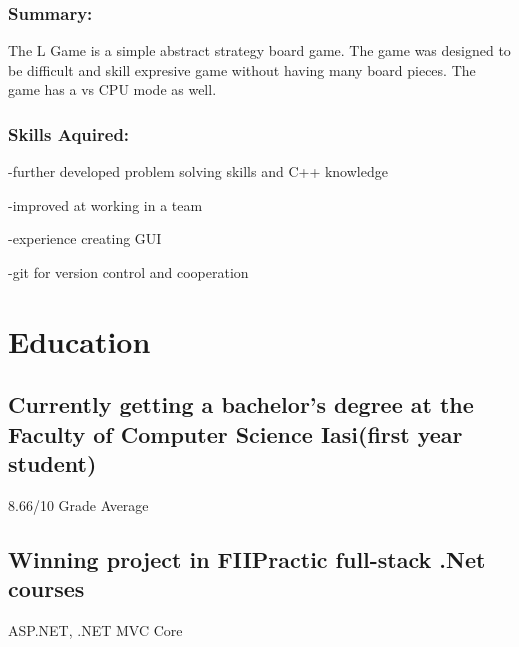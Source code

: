\documentclass[a4paper,hidelinks,8pt]{article}
\begin{document}
\subsubsection{Summary:}
The L Game is a simple abstract strategy board game. The game was designed to be difficult and skill expresive
game without having many board pieces. The game has a vs CPU mode as well.
\subsubsection{Skills Aquired:}
-further developed problem solving skills and C++ knowledge

-improved at working in a team

-experience creating GUI

-git for version control and cooperation

\section{Education}
\subsection{Currently getting a bachelor's degree at 
the Faculty of Computer Science Iasi(first year student)}
 8.66/10 Grade Average

\subsection{Winning project in FIIPractic full-stack .Net courses}
ASP.NET, .NET MVC Core
\end{document}
